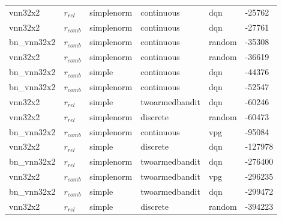 \begin{table}[]
{\begin{tabular}{l|l|l|l|l|l}
            vnn32x2          &       $r_{rel}$        &       simplenorm             &   continuous         & dqn                  & -25762     \\
            vnn32x2          &       $r_{comb}$       &       simplenorm             &   continuous         & dqn                  & -27761     \\
            bn\_vnn32x2      &       $r_{comb}$       &       simplenorm             &   continuous         & random               & -35308     \\
            vnn32x2          &       $r_{comb}$       &       simplenorm             &   continuous         & random               & -36619     \\
            bn\_vnn32x2      &       $r_{comb}$       &       simple                 &   continuous         & dqn                  & -44376     \\
            bn\_vnn32x2      &       $r_{comb}$       &       simplenorm             &   continuous         & dqn                  & -52547     \\
            vnn32x2          &       $r_{rel}$        &       simple                 &   twoarmedbandit     & dqn                  & -60246     \\
            vnn32x2          &       $r_{rel}$        &       simplenorm             &   discrete           & random               & -60473     \\
            bn\_vnn32x2      &       $r_{comb}$       &       simplenorm             &   continuous         & vpg                  & -95084     \\
            vnn32x2          &       $r_{rel}$        &       simple                 &   discrete           & dqn                  & -127978    \\
            bn\_vnn32x2      &       $r_{rel}$        &       simplenorm             &   twoarmedbandit     & dqn                  & -276400    \\
            vnn32x2          &       $r_{comb}$       &       simplenorm             &   twoarmedbandit     & vpg                  & -296235    \\
            bn\_vnn32x2      &       $r_{comb}$       &       simple                 &   twoarmedbandit     & dqn                  & -299472    \\
            vnn32x2          &       $r_{rel}$        &       simple                 &   discrete           & random               & -394223    \\

\end{tabular}}
\end{table}
